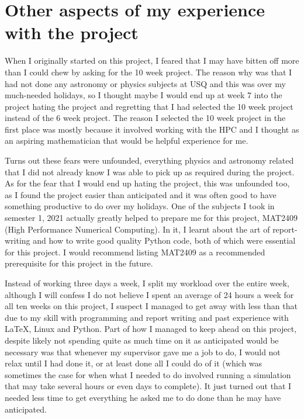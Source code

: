 \documentclass[12pt,a4paper,openright]{article}
\begin{document}
\section{Other aspects of my experience with the project}
When I originally started on this project, I feared that I may have bitten off more than I could chew by asking for the 10 week project. The reason why was that I had not done any astronomy or physics subjects at USQ and this was over my much-needed holidays, so I thought maybe I would end up at week 7 into the project hating the project and regretting that I had selected the 10 week project instead of the 6 week project. The reason I selected the 10 week project in the first place was mostly because it involved working with the HPC and I thought as an aspiring mathematician that would be helpful experience for me. 

Turns out these fears were unfounded, everything physics and astronomy related that I did not already know I was able to pick up as required during the project. As for the fear that I would end up hating the project, this was unfounded too, as I found the project easier than anticipated and it was often good to have something productive to do over my holidays. One of the subjects I took in semester 1, 2021 actually greatly helped to prepare me for this project, MAT2409 (High Performance Numerical Computing). In it, I learnt about the art of report-writing and how to write good quality Python code, both of which were essential for this project. I would recommend listing MAT2409 as a recommended prerequisite for this project in the future. 

Instead of working three days a week, I split my workload over the entire week, although I will confess I do not believe I spent an average of 24 hours a week for all ten weeks on this project, I suspect I managed to get away with less than that due to my skill with programming and report writing and past experience with LaTeX, Linux and Python. Part of how I managed to keep ahead on this project, despite likely not spending quite as much time on it as anticipated would be necessary was that whenever my supervisor gave me a job to do, I would not relax until I had done it, or at least done all I could do of it (which was sometimes the case for when what I needed to do involved running a simulation that may take several hours or even days to complete). It just turned out that I needed less time to get everything he asked me to do done than he may have anticipated. 
\end{document}
